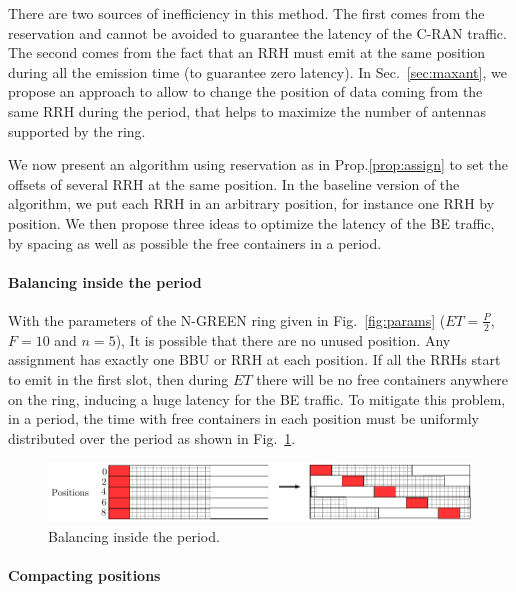 \documentclass[10pt, conference, letterpaper]{IEEEtran}
\begin{document}
There are two sources of inefficiency in this method. The first comes from the reservation and cannot be avoided to guarantee the latency of the C-RAN traffic. The second comes from the fact that an RRH must emit at the same position during all the emission time (to guarantee zero latency). In Sec.~\ref{sec:maxant}, we propose an approach to allow to change the position of data coming from the same RRH during the period, that helps to maximize the number of antennas supported by the ring.




We now present an algorithm using reservation as in Prop.\ref{prop:assign} to set the offsets of several RRH at the same position. In the baseline version of the algorithm, we put each RRH in an arbitrary position, for instance one RRH by position. We then propose three ideas to optimize the latency of the BE traffic, by spacing as well as possible the free containers in a period.

\paragraph{Balancing inside the period}

With the parameters of the N-GREEN ring given in Fig.~\ref{fig:params} ($ET = \frac{P}{2}$, $F = 10$ and $n = 5$), It is possible that there are no unused position. Any assignment has exactly one  BBU or RRH at each position. If all the RRHs start to emit in the first slot, then during $ET$ there will be no free containers anywhere on the ring, inducing a huge latency for the BE traffic. 
To mitigate this problem, in a period, the time with free containers in each position must be uniformly distributed over the period as shown in Fig.~\ref{fig:periodbal}.
\begin{figure}[h!]
\begin{center}   

      \includegraphics[scale=0.55]{repart2}
     \caption{Balancing inside the period.}\label{fig:periodbal}
     
\end{center}
  \end{figure}  
  

  
\paragraph{Compacting positions}
\end{document}
